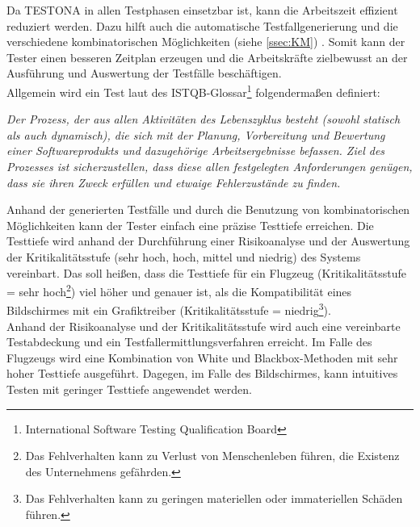 Da TESTONA in allen Testphasen einsetzbar ist, kann die Arbeitszeit effizient reduziert werden. Dazu hilft auch die automatische Testfallgenerierung und die verschiedene kombinatorischen Möglichkeiten (siehe \ref{ssec:KM}) . Somit kann der Tester einen besseren Zeitplan erzeugen und die Arbeitskräfte zielbewusst an der Ausführung und Auswertung der Testfälle beschäftigen.\\

Allgemein wird ein Test laut des ISTQB-Glossar\footnote{International Software Testing Qualification Board} folgendermaßen definiert:

\begin{center}
\textit{
Der Prozess, der aus allen Aktivitäten des Lebenszyklus besteht (sowohl statisch als auch dynamisch), die sich mit der Planung, Vorbereitung und Bewertung einer Softwareprodukts und dazugehörige Arbeitsergebnisse befassen. Ziel des Prozesses ist sicherzustellen, dass diese allen festgelegten Anforderungen genügen, dass sie ihren Zweck erfüllen und etwaige Fehlerzustände zu finden.}\cite{SoftwareTestEmbSys}\\

\end{center}

Anhand der generierten Testfälle und durch die Benutzung von kombinatorischen Möglichkeiten kann der Tester einfach eine präzise Testtiefe erreichen. Die Testtiefe wird anhand der Durchführung einer Risikoanalyse und der Auswertung der Kritikalitätsstufe (sehr hoch, hoch, mittel und niedrig) des Systems vereinbart. Das soll heißen, dass die Testtiefe für ein Flugzeug (Kritikalitätsstufe = sehr hoch\footnote{Das Fehlverhalten kann zu Verlust von Menschenleben führen, die Existenz des Unternehmens gefährden.}) viel höher und genauer ist, als die Kompatibilität eines Bildschirmes mit ein Grafiktreiber (Kritikalitätsstufe = niedrig\footnote{Das Fehlverhalten kann zu geringen materiellen oder immateriellen Schäden führen.}).\\

Anhand der Risikoanalyse und der Kritikalitätsstufe wird auch eine vereinbarte Testabdeckung und ein Testfallermittlungsverfahren erreicht. Im Falle des Flugzeugs wird eine Kombination von White und Blackbox-Methoden mit sehr hoher Testtiefe ausgeführt. Dagegen, im Falle des Bildschirmes, kann intuitives Testen mit geringer Testtiefe angewendet werden.\cite{ApplicationEngineering}

